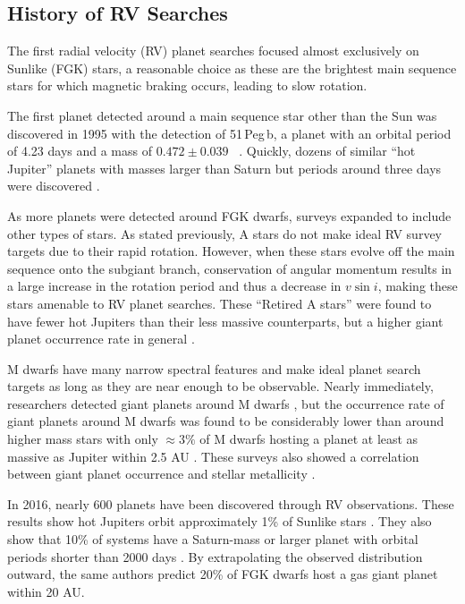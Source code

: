 \subsection{History of RV Searches}
The first radial velocity (RV) planet searches focused almost exclusively on Sunlike
(FGK) stars, a reasonable choice as these are the brightest main sequence stars for 
which magnetic braking occurs, leading to slow rotation.

The first planet detected around a main sequence star other than the Sun was discovered
in 1995 with the detection of 51\,Peg\,b, a planet with an orbital period of 4.23 days
and a mass of $0.472 \pm 0.039$ \mjup\ \citep{Mayor95}.
Quickly, dozens of similar ``hot Jupiter'' planets with masses larger than Saturn but 
periods around three days were discovered \citep[e.g.][]{Marcy98, Butler97, Wright07}.

As more planets were detected around FGK dwarfs, surveys expanded to include other
types of stars.
As stated previously, A stars do not make ideal RV survey targets due to their rapid
rotation.
However, when these stars evolve off the main sequence onto the subgiant branch,
conservation of angular momentum results in a large increase in the rotation period and
thus a decrease in $v \sin i$, making these stars amenable to RV planet searches.
These ``Retired A stars'' were found to have fewer hot Jupiters than their less massive
counterparts, but a higher giant planet occurrence rate in general \citep{Johnson07b,
Johnson11b, Bowler10}.

M dwarfs have many narrow spectral features and make ideal planet search targets as
long as they are near enough to be observable.
Nearly immediately, researchers detected giant planets around M dwarfs \citep{Butler04, Butler06}, but the occurrence rate of giant planets around M dwarfs was found to be 
considerably lower than around higher mass stars with
only $\approx 3\%$ of M dwarfs hosting a planet at least as massive as Jupiter 
within 2.5 AU \citep{Johnson10a, Bonfils13}.
These surveys also showed a correlation between giant planet occurrence and stellar
metallicity \citep{Fischer05, JohnsonApps09}.



In 2016, nearly 600 planets have been discovered through RV observations.
These results show hot Jupiters orbit approximately 1\% of Sunlike stars \citep{Wright12}.
They also show that 10\% of systems have a Saturn-mass or larger planet with orbital periods
shorter than 2000 days \citep{Cumming08}.
By extrapolating the observed distribution outward, the same authors predict 20\% of FGK dwarfs host a gas giant planet within 20 AU.

